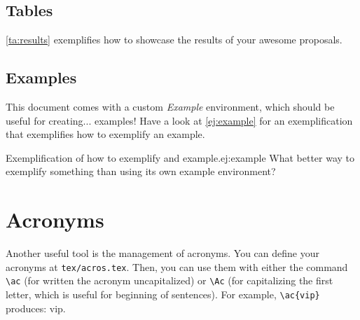 \subsection{Tables}
\cref{ta:results} exemplifies how to showcase the results of your awesome proposals.

\begin{table}[!ht]
	\caption[How to showcase the results of your awesome proposals.]{How to showcase the results of your awesome proposals.}
	\label{ta:results}
	\centering
\end{table}

\subsection{Examples}
This document comes with a custom \emph{Example} environment, which should be useful for creating... examples! Have a look at \cref{ej:example} for an exemplification that exemplifies how to exemplify an example.

\begin{Ejemplo}{Exemplification of how to exemplify and example.}{ej:example}
	What better way to exemplify something than using its own example environment?
	\label{ej:example}
\end{Ejemplo}

\section{Acronyms}
Another useful tool is the management of acronyms. You can define your acronyms at \texttt{tex/acros.tex}. Then, you can use them with either the command \texttt{{\backslash}ac} (for written the acronym uncapitalized) or \texttt{{\backslash}Ac} (for capitalizing the first letter, which is useful for beginning of sentences). For example, \texttt{{\backslash}ac\{vip\}} produces: \ac{vip}.